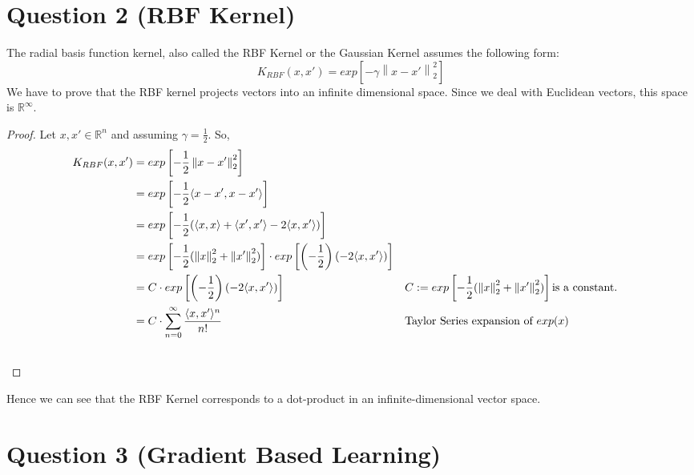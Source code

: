 \documentclass[fleqn]{article}
\newcommand{\norm}[1]{\left\lVert#1\right\rVert} %
\begin{document}
\section*{Question 2 (RBF Kernel)}
The radial basis function kernel, also called the RBF Kernel or the Gaussian Kernel assumes the following form:
\begin{equation*}
    K_{RBF} (x, x') = exp[-\gamma \norm{x- x'}^2_2]
\end{equation*}
We have to prove that the RBF kernel projects vectors into an infinite dimensional space. Since we deal with Euclidean vectors, this space is $\mathbb{R}^{\infty}$.
\begin{proof}
  Let $x, x' \in \mathbb{R}^n$ and assuming $\gamma =\frac{1}{2}$. So,
  \begin{align*}
    K_{RBF}(x, x') &= exp\left[-\frac{1}{2} \norm{ x - x'}^2_2 \right]\\
    &= exp\left[-\frac{1}{2} \langle x - x', x - x' \rangle \right] \\
    &= exp\left[-\frac{1}{2} (\langle x, x \rangle + \langle x', x'\rangle - 2 \langle x , x'\rangle)\right]\\
    &= exp\left[-\frac{1}{2} (\norm{x}^2_2 + \norm{x'}^2_2)\right] \cdot exp\left[\left(-\frac{1}{2}\right) (-2 \langle x, x' \rangle)\right] \\
    &=  C \cdot exp\left[\left(-\frac{1}{2}\right) (-2 \langle x, x'\rangle)\right] && C := exp\left[-\frac{1}{2} (\norm{x}^2_2 + \norm{x'}^2_2)\right] \text{is a constant.}\\ 
    &= C \cdot \sum_{n=0}^{\infty} \frac{\langle x,x' \rangle ^n}{n!}  && \text{Taylor Series expansion of } exp(x)\\
    &&\qedhere
  \end{align*}
\end{proof}
Hence we can see that the RBF Kernel corresponds to a dot-product in an infinite-dimensional vector space.


\section*{Question 3 (Gradient Based Learning)}
\end{document}
